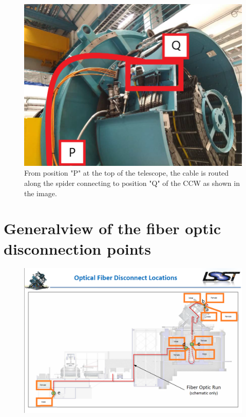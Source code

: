 \newpage

\begin{figure}
  \centering
  \includegraphics[width=20cm]{images/34.png}
  \caption*{From position "P" at the top of the telescope, the cable is routed along the spider connecting to position "Q" of the CCW as shown in the image.}
\end{figure}

\newpage

\section{Generalview of the fiber optic disconnection points}
\label{sec:disconnectpoints}
\vspace{30 mm}
\begin{figure}
  \centering
  \includegraphics[width=17cm]{images/33333.png}
\end{figure}

